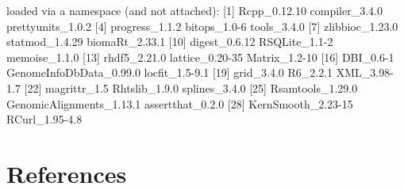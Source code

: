 \documentclass[12pt]{report}
\renewenvironment{Schunk}{\vspace{0pt}}{\vspace{0pt}}
\begin{document}
\begin{Schunk}
\begin{Soutput}
loaded via a namespace (and not attached):
 [1] Rcpp_0.12.10             compiler_3.4.0           prettyunits_1.0.2       
 [4] progress_1.1.2           bitops_1.0-6             tools_3.4.0             
 [7] zlibbioc_1.23.0          statmod_1.4.29           biomaRt_2.33.1          
[10] digest_0.6.12            RSQLite_1.1-2            memoise_1.1.0           
[13] rhdf5_2.21.0             lattice_0.20-35          Matrix_1.2-10           
[16] DBI_0.6-1                GenomeInfoDbData_0.99.0  locfit_1.5-9.1          
[19] grid_3.4.0               R6_2.2.1                 XML_3.98-1.7            
[22] magrittr_1.5             Rhtslib_1.9.0            splines_3.4.0           
[25] Rsamtools_1.29.0         GenomicAlignments_1.13.1 assertthat_0.2.0        
[28] KernSmooth_2.23-15       RCurl_1.95-4.8          
\end{Soutput}
\end{Schunk}

\section{References}


\end{document}
